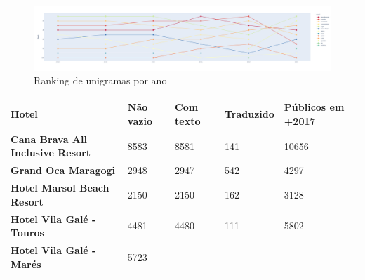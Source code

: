 \begin{figure}
	\centering
	\includegraphics[width=1\textwidth]{figs/exploratoria/ranking_unigramas_por_ano.png}
	\caption{Ranking de unigramas por ano}
	\label{img:rank_unigramas}
\end{figure}

\begin{table}[]
	\centering
	\begin{tabular}{|p{5cm}|l|l|l|l|}
		\hline
		\textbf{Hotel}                                      &
		\textbf{Não vazio}                                  &
		\textbf{Com texto}                                  &
		\textbf{Traduzido}                                  &
		\textbf{Públicos em +2017}                            \\
		\hline
		\textbf{Cana Brava All Inclusive Resort}            &
		8583                                                &
		8581                                                &
		141                                                 &
		10656                                                 \\
		\hline
		\textbf{Grand Oca Maragogi}                         &
		2948                                                &
		2947                                                &
		542                                                 &
		4297                                                  \\
		\hline
		\textbf{Hotel Marsol Beach Resort}                  &
		2150                                                &
		2150                                                &
		162                                                 &
		3128                                                  \\
		\hline
		\textbf{Hotel Vila Galé - Touros}                   &
		4481                                                &
		4480                                                &
		111                                                 &
		5802                                                  \\
		\hline
		\textbf{Hotel Vila Galé - Marés}                    &
		5723                                                &

\end{tabular}
\end{table}
